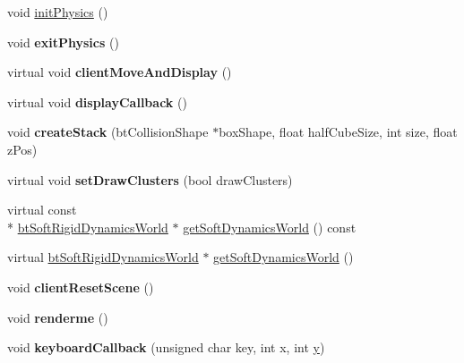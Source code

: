 \begin{DoxyCompactItemize}
\item 
void \hyperlink{class_soft_demo_ad794633dd7396c732956f930398e3c4b}{init\+Physics} ()
\item 
\hypertarget{class_soft_demo_a4c081c006f392cc0fe921008867a9407}{void {\bfseries exit\+Physics} ()}\label{class_soft_demo_a4c081c006f392cc0fe921008867a9407}

\item 
\hypertarget{class_soft_demo_add92b79517a8076d55df9cd7c83728e9}{virtual void {\bfseries client\+Move\+And\+Display} ()}\label{class_soft_demo_add92b79517a8076d55df9cd7c83728e9}

\item 
\hypertarget{class_soft_demo_adcb165e5bbedde6a6e138a358fe2ea69}{virtual void {\bfseries display\+Callback} ()}\label{class_soft_demo_adcb165e5bbedde6a6e138a358fe2ea69}

\item 
\hypertarget{class_soft_demo_a9054b1ac9fdb834179b8f8f6526c4836}{void {\bfseries create\+Stack} (bt\+Collision\+Shape $\ast$box\+Shape, float half\+Cube\+Size, int size, float z\+Pos)}\label{class_soft_demo_a9054b1ac9fdb834179b8f8f6526c4836}

\item 
\hypertarget{class_soft_demo_a9346e1456d886c58fb4b811a2b86e6d1}{virtual void {\bfseries set\+Draw\+Clusters} (bool draw\+Clusters)}\label{class_soft_demo_a9346e1456d886c58fb4b811a2b86e6d1}

\item 
virtual const \\*
\hyperlink{classbt_soft_rigid_dynamics_world}{bt\+Soft\+Rigid\+Dynamics\+World} $\ast$ \hyperlink{class_soft_demo_a0ab9c8a0fd1df67589aaf842568941f1}{get\+Soft\+Dynamics\+World} () const 
\item 
virtual \hyperlink{classbt_soft_rigid_dynamics_world}{bt\+Soft\+Rigid\+Dynamics\+World} $\ast$ \hyperlink{class_soft_demo_a6c0f29453b21c234b97662af54434af7}{get\+Soft\+Dynamics\+World} ()
\item 
\hypertarget{class_soft_demo_aa267cb6b5fed8d934d88b9ac290c0a3e}{void {\bfseries client\+Reset\+Scene} ()}\label{class_soft_demo_aa267cb6b5fed8d934d88b9ac290c0a3e}

\item 
\hypertarget{class_soft_demo_a8025b1ab70fd9a7d61cc4b8270514788}{void {\bfseries renderme} ()}\label{class_soft_demo_a8025b1ab70fd9a7d61cc4b8270514788}

\item 
\hypertarget{class_soft_demo_a1322112774cbaef96c17af1172c89330}{void {\bfseries keyboard\+Callback} (unsigned char key, int x, int \hyperlink{_ice_utils_8h_aa7ffaed69623192258fb8679569ff9ba}{y})}\label{class_soft_demo_a1322112774cbaef96c17af1172c89330}


\end{DoxyCompactItemize}
